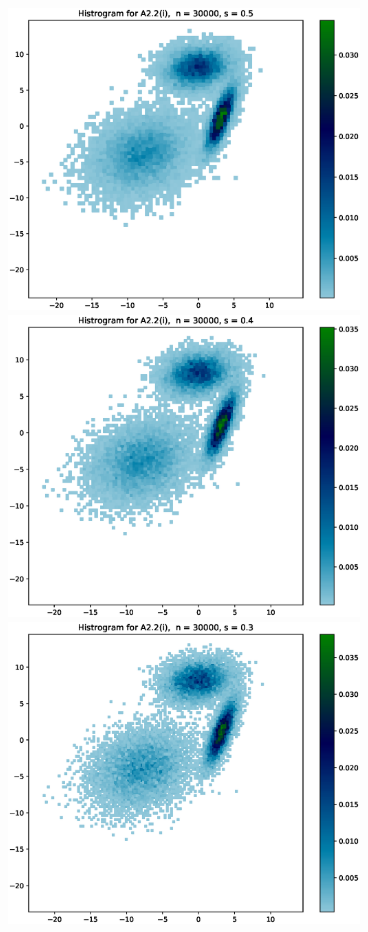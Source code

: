\documentclass{article}
\begin{document}
\hspace*{-1.5cm}\includegraphics[height=8cm]{Figures_for_A2.2_i//5.eps} \hspace*{-1.5cm}
\includegraphics[height=8cm]{Figures_for_A2.2_i//6.eps}\\
\hspace*{-1.5cm}\includegraphics[height=8cm]{Figures_for_A2.2_i//7.eps} \hspace*{-1.5cm}
\end{document}
